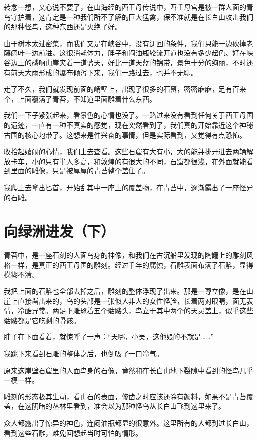 转念一想，又心说不要了，在山海经的西王母传说中，西壬母宫是被一群人面的青鸟守护着，这肯定是一种我们所不了解的巨大猛禽，保不准就是在长白山攻击我们的那种怪鸟，这种东西还是灭绝了好。

由于树木太过密集，而我们又是在峡谷中，没有迂回的条件，我们只能一边砍掉老藤阔叶一边前进。这很消耗体力，胖子和闷油瓶轮流开道也没有多少起色。好在峡谷边上的磷响山崖夹着一道蓝天，好比一道天蓝的锦带，景色十分的绚丽，不时还有前天大雨形成的瀑布倾泻下来，我们一路过去，也并不无聊。

走了不久，我们就发现前面的峭壁上，出现了很多的石窟，密密麻麻，足有百来个，上面覆满了青苔，不知道里面雕着什么东西。

我们一下子紧张起来，看景色的心情也没了。一路过来没有看到任何关于西王母国的遗迹，一直有一种不真实的感觉，现在突然看到了，我们真的开始靠近这个神秘古国的核心地带了。这想来是件兴奋的事情，但是实际看到，又觉得有点恐怖。

收拾起嬉闹的心情，我们上去查看。这些石窟有大有小，大的能并排开进去两辆解放卡车，小的只有半人多高，和敦煌的有很大的不同，石窟都很浅，在外面就能看到里面的雕像，只是被厚厚的青苔整个盖住了。

我爬上去拿出匕首，开始刮其中一座上的覆盖物，在青苔中，逐渐露出了一座怪异的石雕。

\chapter{向绿洲进发（下）}

青苔中，是一座石刻的人面鸟身的神像，和我们在古沉船里发现的陶罐上的雕刻风格一样，是真正的西王母国的雕刻。经过千年的腐蚀，石雕表面布满了石斛，显得模糊不清。

我把上面的石斛也全部去掉之后，雕刻的整体浮现了出来。那是一尊立像，是在山崖上直接凿出来的，鸟的头部是一张似人非人的女性怪脸，长着两对眼睛，面无表情，冷酷异常。两足下雕琢着五个骷髅头，鸟立于其中两个的天灵盖上，似乎这些骷髅都是它吃剩的骨骸。

胖子在下面看着，就惊呼了一声：“天哪，小吴，这他娘的不就是……”

我跳下来看到石雕的整体之后，也倒吸了一口冷气。

原来这崖壁石窟里的人面鸟身的石像，竟然和在长白山地下裂隙中看到的怪鸟几乎一模一样。

雕刻的形态极其生动，看山石的表面，修凿之时应该还涂有颜料，如果不是青苔覆盖，在这阴暗的丛林里看到，准会以为那种怪鸟从长白山飞到这里来了。

众人都露出了惊异的神色，连闷油瓶都显的很意外。这里所有的人都到过长白山，看到这些石雕，难免回想起当时可怕的情形。

